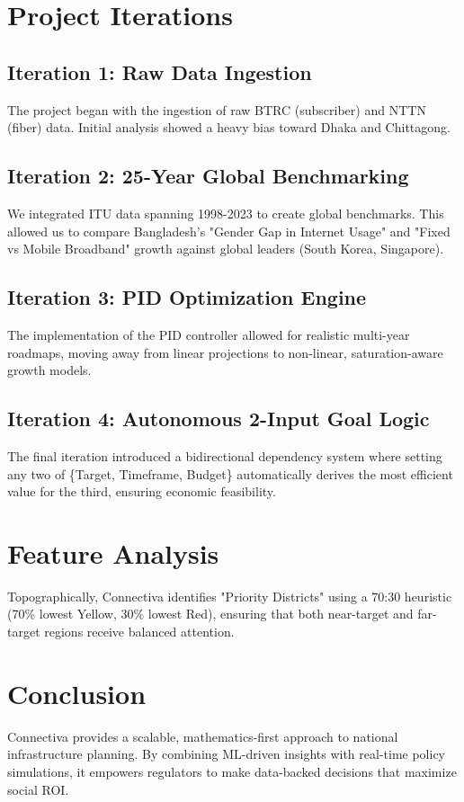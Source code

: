 \documentclass[12pt,a4paper]{article}
\begin{document}
\section{Project Iterations}

\subsection{Iteration 1: Raw Data Ingestion}
The project began with the ingestion of raw BTRC (subscriber) and NTTN (fiber) data. Initial analysis showed a heavy bias toward Dhaka and Chittagong.

\subsection{Iteration 2: 25-Year Global Benchmarking}
We integrated ITU data spanning 1998-2023 to create global benchmarks. This allowed us to compare Bangladesh's "Gender Gap in Internet Usage" and "Fixed vs Mobile Broadband" growth against global leaders (South Korea, Singapore).

\subsection{Iteration 3: PID Optimization Engine}
The implementation of the PID controller allowed for realistic multi-year roadmaps, moving away from linear projections to non-linear, saturation-aware growth models.

\subsection{Iteration 4: Autonomous 2-Input Goal Logic}
The final iteration introduced a bidirectional dependency system where setting any two of \{Target, Timeframe, Budget\} automatically derives the most efficient value for the third, ensuring economic feasibility.

\section{Feature Analysis}
Topographically, Connectiva identifies "Priority Districts" using a 70:30 heuristic (70\% lowest Yellow, 30\% lowest Red), ensuring that both near-target and far-target regions receive balanced attention.

\section{Conclusion}
Connectiva provides a scalable, mathematics-first approach to national infrastructure planning. By combining ML-driven insights with real-time policy simulations, it empowers regulators to make data-backed decisions that maximize social ROI.
\end{document}
